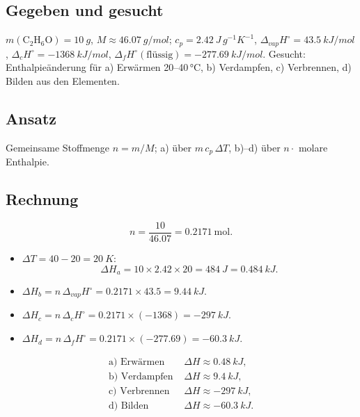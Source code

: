 
\subsection*{Gegeben und gesucht}
$m(\mathrm{C_2H_6O}) = \qty{10}{g}$, $M \approx \qty{46.07}{g/mol}$;
$c_p = \qty{2.42}{J\,g^{-1}K^{-1}}$,
$\Delta_{vap}H^\circ = \qty{43.5}{kJ/mol}$,
$\Delta_cH^\circ = \qty{-1368}{kJ/mol}$,
$\Delta_fH^\circ(\text{flüssig}) = \qty{-277.69}{kJ/mol}$.
Gesucht: Enthalpieänderung für a) Erwärmen 20--40\,°C, b) Verdampfen,
c) Verbrennen, d) Bilden aus den Elementen.

\subsection*{Ansatz}
Gemeinsame Stoffmenge $n = m/M$; a) über $m\,c_p\,\Delta T$, b)--d) über
$n\cdot$ molare Enthalpie.

\subsection*{Rechnung}
\begin{equation*}
  n = \frac{10}{46.07} = 0.2171\ \mathrm{mol}.
\end{equation*}
\begin{itemize}
  \item[a)] $\Delta T = 40 - 20 = \qty{20}{K}$:
        \begin{equation*}
          \Delta H_a = 10\times 2.42 \times 20 = \qty{484}{J}
          = \qty{0.484}{kJ}.
        \end{equation*}
  \item[b)] $\Delta H_b = n\,\Delta_{vap}H^\circ
        = 0.2171\times 43.5 = \qty{9.44}{kJ}$.
  \item[c)] $\Delta H_c = n\,\Delta_cH^\circ
        = 0.2171\times(-1368) = \qty{-297}{kJ}$.
  \item[d)] $\Delta H_d = n\,\Delta_fH^\circ
        = 0.2171\times(-277.69) = \qty{-60.3}{kJ}$.
\end{itemize}

\begin{ergebnis}
\begin{align*}
  \text{a) Erwärmen } &\Delta H \approx \qty{0.48}{kJ},\\
  \text{b) Verdampfen } &\Delta H \approx \qty{9.4}{kJ},\\
  \text{c) Verbrennen } &\Delta H \approx \qty{-297}{kJ},\\
  \text{d) Bilden } &\Delta H \approx \qty{-60.3}{kJ}.
\end{align*}
\end{ergebnis}

